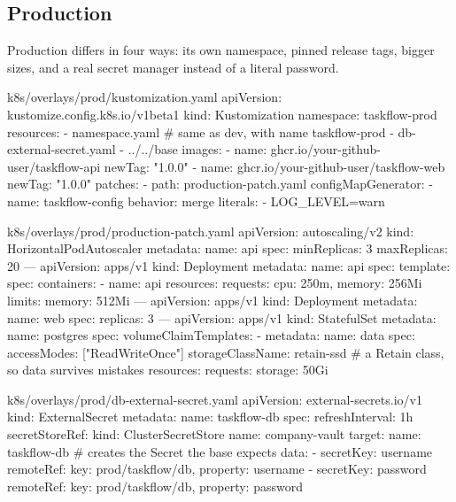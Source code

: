 \subsection{Production}

Production differs in four ways: its own namespace, pinned release tags, bigger
sizes, and a real secret manager instead of a literal password.

\begin{yamlcode}{k8s/overlays/prod/kustomization.yaml}
apiVersion: kustomize.config.k8s.io/v1beta1
kind: Kustomization
namespace: taskflow-prod
resources:
  - namespace.yaml                     # same as dev, with name taskflow-prod
  - db-external-secret.yaml
  - ../../base
images:
  - name: ghcr.io/your-github-user/taskflow-api
    newTag: "1.0.0"
  - name: ghcr.io/your-github-user/taskflow-web
    newTag: "1.0.0"
patches:
  - path: production-patch.yaml
configMapGenerator:
  - name: taskflow-config
    behavior: merge
    literals:
      - LOG_LEVEL=warn
\end{yamlcode}

\begin{yamlcode}{k8s/overlays/prod/production-patch.yaml}
apiVersion: autoscaling/v2
kind: HorizontalPodAutoscaler
metadata:
  name: api
spec:
  minReplicas: 3
  maxReplicas: 20
---
apiVersion: apps/v1
kind: Deployment
metadata:
  name: api
spec:
  template:
    spec:
      containers:
        - name: api
          resources:
            requests: { cpu: 250m, memory: 256Mi }
            limits:   { memory: 512Mi }
---
apiVersion: apps/v1
kind: Deployment
metadata:
  name: web
spec:
  replicas: 3
---
apiVersion: apps/v1
kind: StatefulSet
metadata:
  name: postgres
spec:
  volumeClaimTemplates:
    - metadata:
        name: data
      spec:
        accessModes: ["ReadWriteOnce"]
        storageClassName: retain-ssd   # a Retain class, so data survives mistakes
        resources:
          requests:
            storage: 50Gi
\end{yamlcode}

\begin{yamlcode}{k8s/overlays/prod/db-external-secret.yaml}
apiVersion: external-secrets.io/v1
kind: ExternalSecret
metadata:
  name: taskflow-db
spec:
  refreshInterval: 1h
  secretStoreRef:
    kind: ClusterSecretStore
    name: company-vault
  target:
    name: taskflow-db                  # creates the Secret the base expects
  data:
    - secretKey: username
      remoteRef: { key: prod/taskflow/db, property: username }
    - secretKey: password
      remoteRef: { key: prod/taskflow/db, property: password }
\end{yamlcode}

